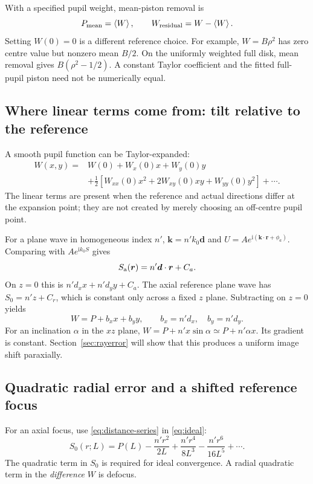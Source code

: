 \documentclass[11pt,a4paper]{article}
\numberwithin{equation}{section}
\newcommand{\ii}{\mathrm{i}}
\newcommand{\vct}[1]{\bm{#1}}
\newcommand{\avg}[1]{\left\langle #1\right\rangle}
\begin{document}
With a specified pupil weight, mean-piston removal is
\[
 P_{\rm mean}=\avg W,\qquad W_{\rm residual}=W-\avg W.
\]
Setting $W(0)=0$ is a different reference choice. For example,
$W=B\rho^2$ has zero centre value but nonzero mean $B/2$.
On the uniformly weighted full disk, mean removal gives
$B(\rho^2-1/2)$. A constant Taylor coefficient and the fitted full-pupil
piston need not be numerically equal.

\subsection{Where linear terms come from: tilt relative to the reference}
A smooth pupil function can be Taylor-expanded:
\begin{align}
 W(x,y)={}&W(0)+W_x(0)x+W_y(0)y\\
 &+\frac12\left[W_{xx}(0)x^2+2W_{xy}(0)xy+W_{yy}(0)y^2\right]+\cdots.
\end{align}
The linear terms are present when the reference and actual directions
differ at the expansion point; they are not created by merely choosing
an off-centre pupil point.

For a plane wave in homogeneous index $n'$,
$\vct k=n'k_0\vct d$ and
$U=Ae^{\ii(\vct k\cdot\vct r+\phi_a)}$. Comparing with $Ae^{\ii k_0S}$
gives
\[
 S_{\rm a}(\vct r)=n'\vct d\cdot\vct r+C_a.
\]
On $z=0$ this is $n'd_xx+n'd_yy+C_a$. The axial reference plane wave has
$S_0=n'z+C_r$, which is constant only across a fixed $z$ plane.
Subtracting on $z=0$ yields
\begin{equation}
 \boxed{
 W=P+b_xx+b_yy,\qquad b_x=n'd_x,\quad b_y=n'd_y.
 }
\end{equation}
For an inclination $\alpha$ in the $xz$ plane,
$W=P+n'x\sin\alpha\simeq P+n'\alpha x$.
Its gradient is constant. Section~\ref{sec:rayerror} will show that this
produces a uniform image shift paraxially.

\subsection{Quadratic radial error and a shifted reference focus}
For an axial focus, use \eqref{eq:distance-series} in \eqref{eq:ideal}:
\begin{equation}
 S_0(r;L)=P(L)-\frac{n'r^2}{2L}+\frac{n'r^4}{8L^3}
 -\frac{n'r^6}{16L^5}+\cdots.
\end{equation}
The quadratic term in $S_0$ is required for ideal convergence. A radial
quadratic term in the \emph{difference} $W$ is defocus.
\end{document}
